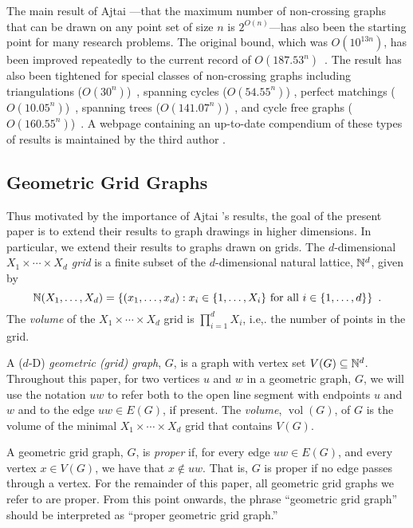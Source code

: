 \documentclass{patmorin}
\DeclareMathOperator{\volume}{vol}
\begin{document}
The main result of Ajtai \etal---that the maximum number
of non-crossing graphs that can be drawn on any point set of
size $n$ is $2^{O(n)}$---has also been the starting point
for many research problems. The original bound, which was
$O(10^{13n})$, has been improved repeatedly to the current record of
$O(187.53^n)$~\cite{sharir.sheffer:counting*1}.  The result has also
been tightened for special classes of non-crossing graphs including
triangulations ($O(30^n)$)~\cite{sharir.sheffer:counting}, spanning
cycles ($O(54.55^n)$) \cite{sharir.sheffer.ea:counting}, perfect
matchings ($O(10.05^n)$)~\cite{sharir.welzl:on}, spanning trees
($O(141.07^n)$)~\cite{hoffmann.sharir.ea:counting}, and cycle free graphs
($O(160.55^n)$)~\cite{hoffmann.sharir.ea:counting,sharir.sheffer:counting}.
A webpage containing an up-to-date compendium of these types of results
is maintained by the third author \cite{sheffer:numbers}.

\subsection{Geometric Grid Graphs}

Thus motivated by the importance of Ajtai \etal's results, the goal of
the present paper is to extend their results to graph drawings in higher
dimensions.  In particular, we extend their results to graphs drawn on
grids.  The $d$-dimensional \emph{$X_1\times\cdots\times X_d$ grid} is
a finite subset of the $d$-dimensional natural lattice, $\mathbb{N}^d$, given by
\[  \mathbb{N}(X_1,\ldots,X_d) = \{(x_1,\ldots,x_d): 
      \mbox{$x_i\in\{1,\ldots,X_i\}$ for all $i\in\{1,\ldots,d\}$}\}
	\enspace .\]
The \emph{volume} of the $X_1\times\cdots\times X_d$ grid is
$\prod_{i=1}^d X_i$, i.e,. the number of points in the grid.

A ($d$-D) \emph{geometric (grid) graph}, $G$, is a graph with vertex
set $V(G)\subseteq \mathbb{N}^d$.  Throughout this paper, for two vertices $u$
and $w$ in a geometric graph, $G$, we will use the notation $uw$ to
refer both to the open line segment with endpoints $u$ and $w$ and to
the edge $uw\in E(G)$, if present.    The \emph{volume}, $\volume(G)$,
of $G$ is the volume of the minimal $X_1\times\cdots\times X_d$ grid
that contains $V(G)$.

A geometric grid graph, $G$, is \emph{proper} if, for every edge $uw\in
E(G)$, and every vertex $x\in V(G)$, we have that $x\not\in uw$.  That is,
$G$ is proper if no edge passes through a vertex.  For the remainder of
this paper, all geometric grid graphs we refer to are proper.  From this
point onwards, the phrase ``geometric grid graph'' should be interpreted
as ``proper geometric grid graph.''
\end{document}
